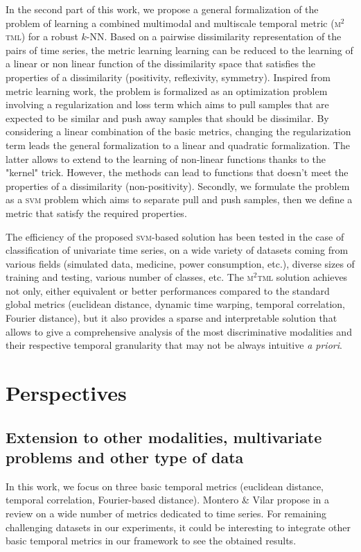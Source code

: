 In the second part of this work, we propose a general formalization of the problem of learning a combined multimodal and multiscale temporal metric (\textsc{m$^2$tml}) for a robust $k$-NN. Based on a pairwise dissimilarity representation of the pairs of time series, the metric learning learning can be reduced to the learning of a linear or non linear function of the dissimilarity space that satisfies the properties of a dissimilarity (positivity, reflexivity, symmetry). Inspired from metric learning work, the problem is formalized as an optimization problem involving a regularization and loss term which aims to pull samples that are expected to be similar and push away samples that should be dissimilar. By considering a linear combination of the basic metrics, changing the regularization term leads the general formalization to a linear and quadratic formalization. The latter allows to extend to the learning of non-linear functions thanks to the "kernel" trick. However, the methods can lead to functions that doesn't meet the properties of a dissimilarity (non-positivity). Secondly, we formulate the problem as a \textsc{svm} problem which aims to separate pull and push samples, then we define a metric that satisfy the required properties. 

The efficiency of the proposed \textsc{svm}-based solution has been tested in the case of classification of univariate time series, on a wide variety of datasets coming from various fields (simulated data, medicine, power consumption, etc.), diverse sizes of training and testing, various number of classes, etc. The \textsc{m$^2$tml} solution achieves not only, either equivalent or better performances compared to the standard global metrics (euclidean distance, dynamic time warping, temporal correlation, Fourier distance), but it also provides a sparse and interpretable solution that allows to give a comprehensive analysis of the most discriminative modalities and their respective temporal granularity that may not be always intuitive \textit{a priori}. 

\section*{Perspectives}
\subsection*{Extension to other modalities, multivariate problems and other type of data}
In this work, we focus on three basic temporal metrics (euclidean distance, temporal correlation, Fourier-based distance). Montero \& Vilar propose in \cite{Montero2014} a review on a wide number of metrics dedicated to time series. For remaining challenging datasets in our experiments, it could be interesting to integrate other basic temporal metrics in our framework to see the obtained results.

